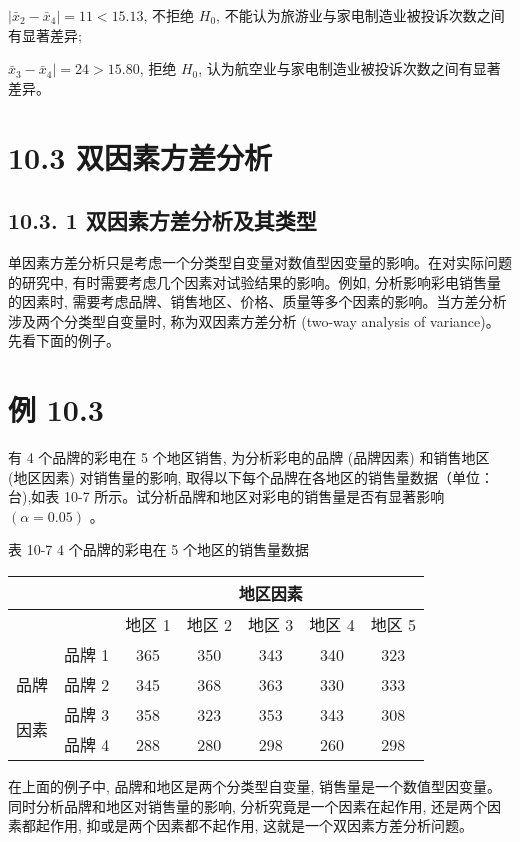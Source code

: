 \documentclass[10pt]{article}
\begin{document}
\begin{CJK*}{UTF8}{bsmi}
$\left|\bar{x}_{2}-\bar{x}_{4}\right|=11<15.13$, 不拒绝 $H_{0}$, 不能认为旅游业与家电制造业被投诉次数之间有显著差异;

$\bar{x}_{3}-\bar{x}_{4} \mid=24>15.80$, 拒绝 $H_{0}$, 认为航空业与家电制造业被投诉次数之间有显著差异。

\section*{10.3 双因素方差分析}
\subsection*{10.3. 1 双因素方差分析及其类型}
单因素方差分析只是考虑一个分类型自变量对数值型因变量的影响。在对实际问题的研究中, 有时需要考虑几个因素对试验结果的影响。例如, 分析影响彩电销售量的因素时, 需要考虑品牌、销售地区、价格、质量等多个因素的影响。当方差分析涉及两个分类型自变量时, 称为双因素方差分析 (two-way analysis of variance)。先看下面的例子。

\section*{例 10.3}
有 4 个品牌的彩电在 5 个地区销售, 为分析彩电的品牌 (品牌因素) 和销售地区 (地区因素) 对销售量的影响, 取得以下每个品牌在各地区的销售量数据（单位：台),如表 10-7 所示。试分析品牌和地区对彩电的销售量是否有显著影响 $(\alpha=0.05)$ 。

表 10-7 4 个品牌的彩电在 5 个地区的销售量数据

\begin{center}
\begin{tabular}{|c|c|c|c|c|c|c|}
\hline
 &  & \multicolumn{5}{|c|}{地区因素} \\
\hline
 &  & 地区 1 & 地区 2 & 地区 3 & 地区 4 & 地区 5 \\
\hline
 & 品牌 1 & 365 & 350 & 343 & 340 & 323 \\
\hline
品牌 & 品牌 2 & 345 & 368 & 363 & 330 & 333 \\
\hline
\multirow[t]{2}{*}{因素} & 品牌 3 & 358 & 323 & 353 & 343 & 308 \\
\hline
 & 品牌 4 & 288 & 280 & 298 & 260 & 298 \\
\hline
\end{tabular}
\end{center}

在上面的例子中, 品牌和地区是两个分类型自变量, 销售量是一个数值型因变量。同时分析品牌和地区对销售量的影响, 分析究竟是一个因素在起作用, 还是两个因素都起作用, 抑或是两个因素都不起作用, 这就是一个双因素方差分析问题。


\end{CJK*}
\end{document}
